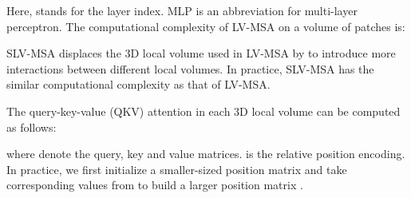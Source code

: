 \documentclass[journal,twoside,web]{ieeecolor}
\begin{document}
Here,  stands for the layer index. MLP is an abbreviation for multi-layer perceptron. The computational complexity of LV-MSA on a volume of  patches is:



SLV-MSA displaces the 3D local volume used in LV-MSA by  to introduce more interactions between different local volumes. In practice, SLV-MSA has the similar computational complexity as that of LV-MSA.

The query-key-value (QKV) attention \cite{vaswani2017attention} in each 3D local volume can be computed as follows:

where  denote the query, key and value matrices.  is the relative position encoding. In practice, we first initialize a smaller-sized position matrix  and take corresponding values from  to build a larger position matrix .\\
\end{document}
